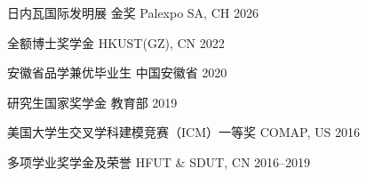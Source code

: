 



\begin{cvhonors}

\cvhonor
  {日内瓦国际发明展 金奖}
  {}
  {Palexpo SA, CH}
  {2026}

\cvhonor
  {全额博士奖学金}
  {}
  {HKUST(GZ), CN}
  {2022}

\cvhonor
  {安徽省品学兼优毕业生}
  {}
  {中国安徽省}
  {2020}

\cvhonor
  {研究生国家奖学金}
  {}
  {教育部}
  {2019}

\cvhonor
  {美国大学生交叉学科建模竞赛（ICM）一等奖}
  {}
  {COMAP, US}
  {2016}

\cvhonor
  {多项学业奖学金及荣誉}
  {}
  {HFUT \& SDUT, CN}
  {2016--2019}

\end{cvhonors}
